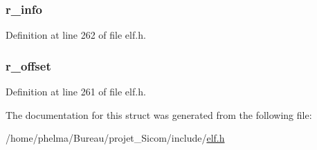\hypertarget{struct_elf32___rela_ac6df6d36f5c8d656fe4e749c859283af}{
\subsubsection[{r\-\_\-info}]{ r\-\_\-info}}\label{struct_elf32___rela_ac6df6d36f5c8d656fe4e749c859283af}


Definition at line 262 of file elf.\-h.

\hypertarget{struct_elf32___rela_af7703a68dd2cbebc5df1fc4ac1ac75a8}{
\subsubsection[{r\-\_\-offset}]{ r\-\_\-offset}}\label{struct_elf32___rela_af7703a68dd2cbebc5df1fc4ac1ac75a8}


Definition at line 261 of file elf.\-h.



The documentation for this struct was generated from the following file\-:\begin{DoxyCompactItemize}
\item 
/home/phelma/\-Bureau/projet\-\_\-\-Sicom/include/\hyperlink{elf_8h}{elf.\-h}\end{DoxyCompactItemize}

